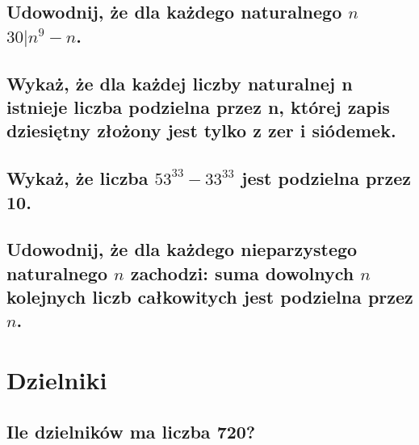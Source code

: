 \documentclass[12pt]{article}
\begin{document}
\subsection{Udowodnij, że dla każdego naturalnego $n$ $30|n^9 - n$.}

\subsection{Wykaż, że dla każdej liczby naturalnej n istnieje liczba podzielna przez n, której zapis dziesiętny złożony jest tylko z zer i siódemek.}

\subsection{Wykaż, że liczba $53^{33} - 33^{33}$ jest podzielna przez 10.}

\subsection{Udowodnij, że dla każdego nieparzystego naturalnego $n$ zachodzi: suma dowolnych $n$ kolejnych liczb całkowitych jest podzielna przez $n$.}

\section{Dzielniki}

\subsection{Ile dzielników ma liczba 720?}
\end{document}
